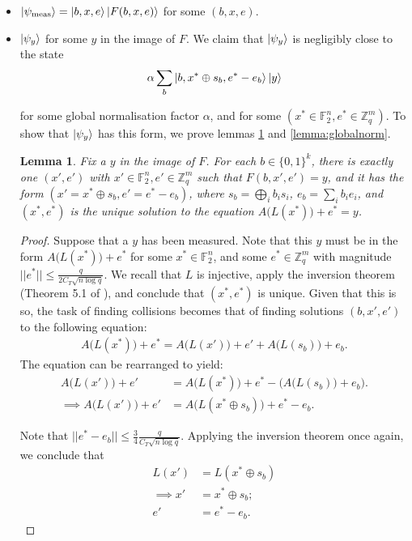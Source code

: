 \documentclass{article}
\newtheorem{lemma}{Lemma}[section]
\begin{document}
\begin{itemize}
		\item $\ket{\psi_{\mathrm{meas}}} = \ket{b, x, e} \ket{F(b, x, e)}$ for some $(b, x, e)$.
     \item $\ket{\psi_y}$ for some $y$ in the image of $F$. We claim that $\ket{\psi_y}$ is negligibly close to the state
		\begin{align}
			\alpha \sum_b \ket{b, x^* \oplus s_b, e^* - e_b} \ket{y}
		\end{align}

		for some global normalisation factor $\alpha$, and for some $(x^* \in \mathbb{F}_2^n, e^* \in \mathbb{Z}_q^m)$. To show that $\ket{\psi_y}$ has this form, we prove lemmas \ref{lemma:psiyform} and \ref{lemma:globalnorm}.
		
		\begin{lemma} \label{lemma:psiyform} Fix a $y$ in the image of $F$. For each $b \in \{0,1\}^k$, there is exactly one $(x', e')$ with $x' \in \mathbb{F}_2^n, e' \in \mathbb{Z}_q^m$ such that $F(b, x', e') = y$, and it has the form $(x' = x^* \oplus s_b, e' = e^* - e_b)$, where $s_b = \bigoplus_i b_i s_i$, $e_b = \sum_i b_i e_i$, and $(x^*, e^*)$ is the unique solution to the equation $A\big( L(x^*) \big) + e^* = y$. \end{lemma}

		\begin{proof} Suppose that a $y$ has been measured. Note that this $y$ must be in the form $A\big( L(x^*) \big) + e^*$ for some $x^* \in \mathbb{F}_2^n$, and some $e^* \in \mathbb{Z}_q^m$ with magnitude $||e^*|| \leq \frac{q}{2C_T\sqrt{n \log q}}$. We recall that $L$ is injective, apply the inversion theorem (Theorem 5.1 of \cite{MP11}), and conclude that $(x^*, e^*)$ is unique. Given that this is so, the task of finding collisions becomes that of finding solutions $(b, x', e')$ to the following equation:
		\begin{align}
			A\big( L(x^*) \big) + e^* = A\big( L(x') \big) + e' + A\big( L(s_{b}) \big) + e_{b}.
		\end{align}
		The equation can be rearranged to yield:
		\begin{align}
			A\big( L(x') \big) + e' &= A\big( L(x^*) \big) + e^* - \Big( A\big( L(s_{b}) \big) + e_{b} \Big). \\
			\implies A\big( L(x') \big) + e' &= A\big( L(x^* \oplus s_{b}) \big) + e^* - e_{b}.
		\end{align}

		Note that $||e^* - e_b|| \leq \frac{3}{4}\frac{q}{C_T\sqrt{n \log q}}$. Applying the inversion theorem once again, we conclude that
		\begin{align}
			L(x') &= L(x^* \oplus s_{b}) \\
			\implies x' &= x^* \oplus s_{b}; \\
			e' &= e^* - e_{b}.
		\end{align}


\end{proof}
\end{itemize}
\end{document}
